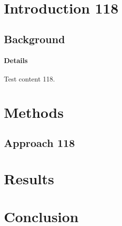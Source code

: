 \documentclass{article}
\begin{document}
\section{Introduction 118}
\subsection{Background}
\paragraph{Details} Test content 118.
\section{Methods}
\subsection{Approach 118}
\section{Results}
\section{Conclusion}
\end{document}
